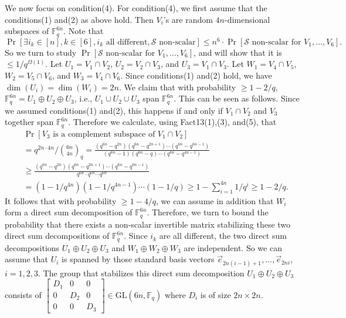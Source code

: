 We now focus on condition(4). For condition(4), we first assume that the conditions(1) and(2) as above hold. Then $V_i$'s are random $4n$-dimensional subspaces of $\mathbb F_q^{6n}$. Note that
\[\Pr[\exists i_k\in[n],k\in[6],i_k\text{ all different},\mathcal S\text{ non-scalar}]\le n^6\cdot\Pr[\mathcal S\text{ non-scalar for }V_1,\ldots,V_6].\]
So we turn to study $\Pr[\mathcal S\text{ non-scalar for }V_1,\ldots,V_6]$, and will show that it is $\le1/q^{\Omega(1)}$.
Let $U_1=V_1\cap V_2$, $U_2=V_2\cap V_3$, and $U_3=V_1\cap V_3$. Let $W_1=V_4\cap V_5$, $W_2=V_5\cap V_6$, and $W_3=V_4\cap V_6$. Since conditions(1) and(2) hold, we have $\dim(U_i)=\dim(W_i)=2n$. We claim that with probability $\ge1-2/q$, $\mathbb F_q^{6n}=U_1\oplus U_2\oplus U_3$, i.e., $U_1\cup U_2\cup U_3$ span $\mathbb F_q^{6n}$. This can be seen as follows. Since we assumed conditions(1) and(2), this happens if and only if $V_1\cap V_2$ and $V_3$ together span $\mathbb F_q^{6n}$. Therefore we calculate, using Fact13(1),(3), and(5), that
\begin{align*}
&\Pr[V_3\text{ is a complement subspace of }V_1\cap V_2]\\
&=q^{2n\cdot4n}/\binom{6n}{4n}_q
=\frac{(q^{6n}-q^{2n})(q^{6n}-q^{2n+1})\cdots(q^{6n}-q^{6n-1})}{(q^{6n}-1)(q^{6n}-q)\cdots(q^{6n}-q^{4n-1})}\\
&\ge\frac{(q^{6n}-q^{2n})(q^{6n}-q^{2n+1})\cdots(q^{6n}-q^{6n-1})}{q^{6n}\cdot q^{6n}\cdots q^{6n}}\\
&=(1-1/q^{4n})(1-1/q^{4n-1})\cdots(1-1/q)\ge1-\sum_{i=1}^{4n}1/q^i\ge1-2/q.
\end{align*}
It follows that with probability $\ge1-4/q$, we can assume in addition that $W_i$ form a direct sum decomposition of $\mathbb F_q^{6n}$.
Therefore, we turn to bound the probability that there exists a non-scalar invertible matrix stabilizing these two direct sum decompositions of $\mathbb F_q^{6n}$. Since $i_k$ are all different, the two direct sum decompositions $U_1\oplus U_2\oplus U_3$ and $W_1\oplus W_2\oplus W_3$ are independent.
So we can assume that $U_i$ is spanned by those standard basis vectors $\vec e_{2n(i-1)+1},\ldots,\vec e_{2ni}$, $i=1,2,3$. The group that stabilizes this direct sum decomposition $U_1\oplus U_2\oplus U_3$ consists of $\begin{bmatrix}D_1&0&0\\0&D_2&0\\0&0&D_3\end{bmatrix}\in\mathrm{GL}(6n,\mathbb F_q)$ where $D_i$ is of size $2n\times2n$.
